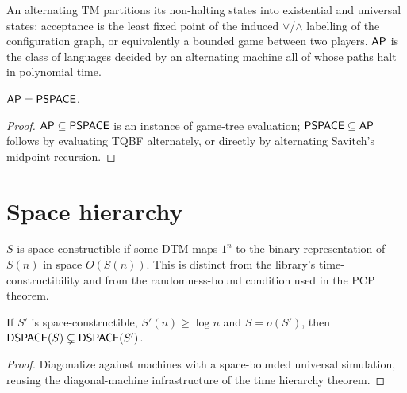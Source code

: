 \begin{definition}
  \label{def:space-atm}
  An alternating TM partitions its non-halting states into existential and
  universal states; acceptance is the least fixed point of the induced
  $\vee$/$\wedge$ labelling of the configuration graph, or equivalently a
  bounded game between two players. $\mathsf{AP}$ is the class of languages decided
  by an alternating machine all of whose paths halt in polynomial time.
\end{definition}

\begin{theorem}[$\cc{AP} = \cc{PSPACE}$]
  \label{thm:space-ap-eq-pspace}
  \notready
  $\cc{AP} = \cc{PSPACE}$.
\end{theorem}
\begin{proof}
  $\mathsf{AP} \subseteq \mathsf{PSPACE}$ is an instance of game-tree evaluation;
  $\mathsf{PSPACE} \subseteq \mathsf{AP}$ follows by evaluating TQBF alternately, or
  directly by alternating Savitch's midpoint recursion.
\end{proof}

\section{Space hierarchy}

\begin{definition}
  \label{def:space-constructible}
  $S$ is space-constructible if some DTM maps $1^n$ to the binary
  representation of $S(n)$ in space $O(S(n))$. This is distinct from the
  library's time-constructibility and from the randomness-bound condition used
  in the PCP theorem.
\end{definition}

\begin{theorem}
  \label{thm:space-hierarchy-det}
  \notready
  If $S'$ is space-constructible, $S'(n) \ge \log n$ and $S = o(S')$, then
  $\mathsf{DSPACE}(S) \subsetneq \mathsf{DSPACE}(S')$.
\end{theorem}
\begin{proof}
  Diagonalize against machines with a space-bounded universal simulation,
  reusing the diagonal-machine infrastructure of the time hierarchy theorem.
\end{proof}

